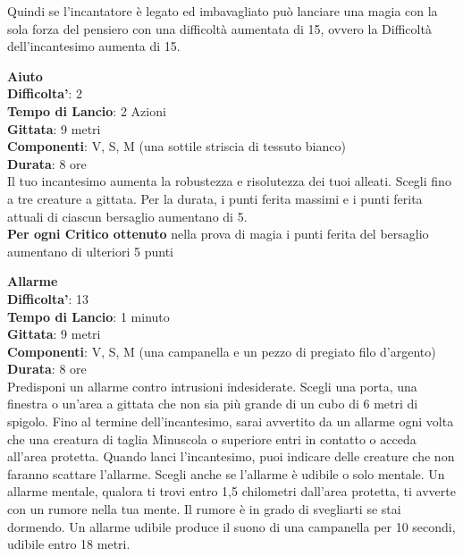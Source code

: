 \begin{multicols}{2}
Quindi se l'incantatore è legato ed imbavagliato può lanciare una magia con la sola forza del pensiero con una difficoltà aumentata di 15, ovvero la Difficoltà dell'incantesimo aumenta di 15.

\pagebreak




\textbf{Aiuto}\\
\textbf{Difficolta'}: 2\\
\textbf{Tempo di Lancio}: 2 Azioni\\
\textbf{Gittata}: 9 metri\\
\textbf{Componenti}: V, S, M (una sottile striscia di tessuto bianco)\\
\textbf{Durata}: 8 ore\\
Il tuo incantesimo aumenta la robustezza e risolutezza dei tuoi alleati. Scegli fino a tre creature a gittata. Per la durata, i punti ferita massimi e i punti ferita attuali di ciascun bersaglio aumentano di 5.\\
\textbf{Per ogni Critico ottenuto} nella prova di magia i punti ferita del bersaglio aumentano di ulteriori 5 punti

\medskip\textbf{Allarme}\\
\textbf{Difficolta'}: 13\\
\textbf{Tempo di Lancio}: 1 minuto\\
\textbf{Gittata}: 9 metri\\
\textbf{Componenti}: V, S, M (una campanella e un pezzo di pregiato filo d’argento)\\
\textbf{Durata}: 8 ore\\
Predisponi un allarme contro intrusioni indesiderate. Scegli una porta, una finestra o un’area a gittata che non sia più grande di un cubo di 6 metri di spigolo. Fino al termine dell’incantesimo, sarai avvertito da un allarme ogni volta che una creatura di taglia Minuscola o superiore entri in contatto o acceda all’area protetta. Quando lanci l’incantesimo, puoi indicare delle creature che non faranno scattare l’allarme. Scegli anche se l’allarme è udibile o solo mentale. Un allarme mentale, qualora ti trovi entro 1,5 chilometri dall’area protetta, ti avverte con un rumore nella tua mente. Il rumore è in grado di svegliarti se stai dormendo. Un allarme udibile produce il suono di una campanella per 10 secondi, udibile entro 18 metri.


\end{multicols}
